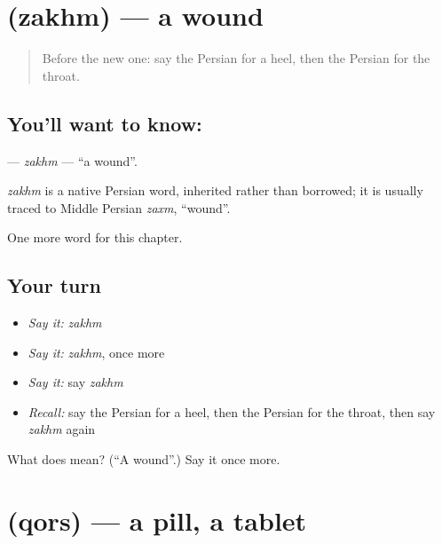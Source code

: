\section[\texorpdfstring{\fa{زخم} (zakhm)}{زخم (zakhm)}]{ (zakhm) — a wound}

\label{lesson:FA-C150-zakhm}



\begin{quote}
Before the new one: say the Persian for a heel, then the Persian for the throat.
\end{quote}

\subsection*{You'll want to know: }
\textbf{} — \emph{zakhm} — \textquotedblleft{}a wound\textquotedblright{}.

\begin{cousinweb}
\emph{zakhm} is a native Persian word, inherited rather than borrowed; it is usually traced to Middle Persian \emph{zaxm}, \textquotedblleft{}wound\textquotedblright{}.
\end{cousinweb}

\begin{grammarlens}[title={What you've built}]
One more word for this chapter.
\end{grammarlens}

\subsection*{Your turn}
\begin{itemize}
\raggedright
  \item \emph{Say it:} \emph{zakhm}
  \item \emph{Say it:} \emph{zakhm}, once more
  \item \emph{Say it:} say \emph{zakhm}
  \item \emph{Recall:} say the Persian for a heel, then the Persian for the throat, then say \emph{zakhm} again
\end{itemize}

\begin{tcolorbox}[breakable,colback=teal!4,colframe=teal!35!black,title={Before you move on}]
What does  mean? (\textquotedblleft{}A wound\textquotedblright{}.) Say it once more.
\end{tcolorbox}
\section[\texorpdfstring{\fa{قرص} (qors)}{قرص (qors)}]{ (qors) — a pill, a tablet}


